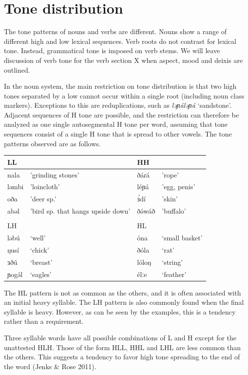 \section{Tone distribution}
The tone patterns of nouns and verbs are different. Nouns show a range of different high and low lexical sequences. Verb roots do not contrast for lexical tone. Instead, grammatical tone is imposed on verb stems. We will leave discussion of verb tone for the verb section X when aspect, mood and deixis are outlined. 

In the noun system, the main restriction on tone distribution is that two high tones separated by a low cannot occur within a single root (including noun class markers). Exceptions to this are reduplications, such as \textit{ləɲáləɲá} ‘sandstone’. Adjacent sequences of H tone are possible, and the restriction can therefore be analyzed as one single autosegmental H tone per word, assuming that tone sequences consist of a single H tone that is spread to other vowels. The tone patterns observed are as follows.

\ea
\begin{tabular}[t]{llll}
LL	&	&	HH \\\hline
nala	&	'grinding stones'	&	ðáɾá	&	'rope'\\
ləmbi	&	'loincloth'			&	léɲá	&	'egg, penis'\\
oða		&	'deer sp.'			&	ɜ́dí		&	'skin'\\
abəl	&	'bird sp. that hangs upside down'	&	ðə́wáð	&	'buffalo'\\
&\\
LH	&	&	HL\\\hline
ləbú	&	‘well’	&	óna		&	‘small basket’\\
ŋusí	&	‘chick’	&	ðóla		&	‘rat’\\
ɜðú		&	‘breast’&	lóloŋ	&	‘string’\\
ɲogə́l	&	‘eagles’&	élːe	&	‘feather’\\
\end{tabular}
\z

The HL pattern is not as common as the others, and it is often associated with an initial heavy syllable. The LH pattern is also commonly found when the final syllable is heavy. However, as can be seen by the examples, this is a tendency rather than a requirement.

Three syllable words have all possible combinations of L and H except for the unattested HLH. Those of the form HLL, HHL and LHL are less common than the others. This suggests a tendency to favor high tone spreading to the end of the word (Jenks \& Rose 2011). 

